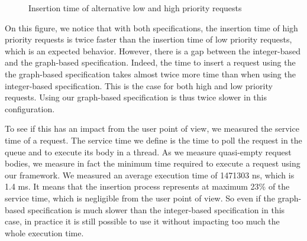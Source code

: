 \documentclass[11pt]{report}
\begin{document}
\begin{figure}[!ht]
      \caption{Insertion time of alternative low and high priority requests}
      \label{fig:alternate} 
\end{figure}

On this figure, we notice that with both specifications, the insertion time of high priority requests is twice faster than the insertion time of low priority requests, which is an expected behavior. However, there is a gap between the integer-based and the graph-based specification. Indeed, the time to insert a request using the the graph-based specification takes almost twice more time than when using the integer-based specification. This is the case for both high and low priority requests. Using our graph-based specification is thus twice slower in this configuration. 

To see if this has an impact from the user point of view, we measured the service time of a request. The service time we define is the time to poll the request in the queue and to execute its body in a thread. As we measure quasi-empty request bodies, we measure in fact the minimum time required to execute a request using our framework.
We measured an average execution time of 1471303 ns, which is 1.4 ms. It means that the insertion process represents at maximum 23\% of the service time, which is negligible from the user point of view. So even if the graph-based specification is much slower than the integer-based specification in this case, in practice it is still possible to use it without impacting too much the whole execution time.
\end{document}
